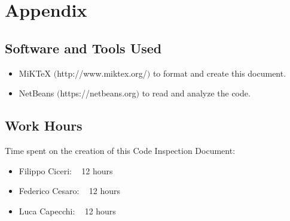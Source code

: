 \section{Appendix}

	\subsection{Software and Tools Used}
	\begin{itemize}
		\item MiKTeX $($http://www.miktex.org/$)$ to format and create this document.
		\item NetBeans $($https://netbeans.org$)$ to read and analyze the code.
	\end{itemize}

	\subsection{Work Hours}
		Time spent on the creation of this Code Inspection Document:
		\begin{itemize}
			\item Filippo Ciceri: ~ 12 hours
			\item Federico Cesaro: ~ 12 hours
			\item Luca Capecchi: ~ 12 hours
		\end{itemize}

